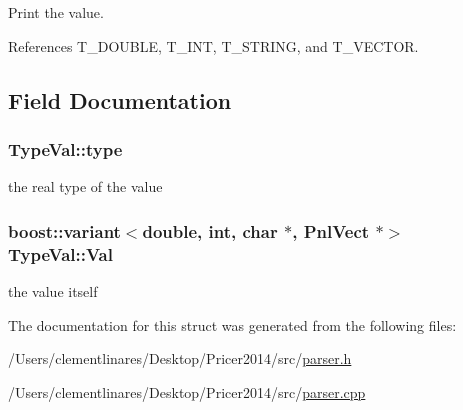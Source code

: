Print the value. 



References T\-\_\-\-D\-O\-U\-B\-L\-E, T\-\_\-\-I\-N\-T, T\-\_\-\-S\-T\-R\-I\-N\-G, and T\-\_\-\-V\-E\-C\-T\-O\-R.



\subsection{Field Documentation}
\hypertarget{structTypeVal_abd5dd71d2a5e2ce2f3b1f018068108ff}{
\subsubsection[{type}]{ Type\-Val\-::type}}\label{structTypeVal_abd5dd71d2a5e2ce2f3b1f018068108ff}


the real type of the value 

\hypertarget{structTypeVal_ab820b6ecfdebfcad3ecd99facbdcaed4}{
\subsubsection[{Val}]{\setlength{\rightskip}{0pt plus 5cm}boost\-::variant$<$double, int, char $\ast$, Pnl\-Vect $\ast$$>$ Type\-Val\-::\-Val}}\label{structTypeVal_ab820b6ecfdebfcad3ecd99facbdcaed4}


the value itself 



The documentation for this struct was generated from the following files\-:\begin{DoxyCompactItemize}
\item 
/\-Users/clementlinares/\-Desktop/\-Pricer2014/src/\hyperlink{parser_8h}{parser.\-h}\item 
/\-Users/clementlinares/\-Desktop/\-Pricer2014/src/\hyperlink{parser_8cpp}{parser.\-cpp}\end{DoxyCompactItemize}
